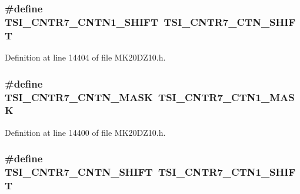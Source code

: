 \subsubsection[{\texorpdfstring{T\+S\+I\+\_\+\+C\+N\+T\+R7\+\_\+\+C\+N\+T\+N1\+\_\+\+S\+H\+I\+FT}{TSI_CNTR7_CNTN1_SHIFT}}]{\setlength{\rightskip}{0pt plus 5cm}\#define T\+S\+I\+\_\+\+C\+N\+T\+R7\+\_\+\+C\+N\+T\+N1\+\_\+\+S\+H\+I\+FT~{\bf T\+S\+I\+\_\+\+C\+N\+T\+R7\+\_\+\+C\+T\+N\+\_\+\+S\+H\+I\+FT}}\hypertarget{group___backward___compatibility___symbols_gaeabebb89e6f4cba3e9cb85dcda2a2d8d}{}\label{group___backward___compatibility___symbols_gaeabebb89e6f4cba3e9cb85dcda2a2d8d}


Definition at line 14404 of file M\+K20\+D\+Z10.\+h.

\subsubsection[{\texorpdfstring{T\+S\+I\+\_\+\+C\+N\+T\+R7\+\_\+\+C\+N\+T\+N\+\_\+\+M\+A\+SK}{TSI_CNTR7_CNTN_MASK}}]{\setlength{\rightskip}{0pt plus 5cm}\#define T\+S\+I\+\_\+\+C\+N\+T\+R7\+\_\+\+C\+N\+T\+N\+\_\+\+M\+A\+SK~{\bf T\+S\+I\+\_\+\+C\+N\+T\+R7\+\_\+\+C\+T\+N1\+\_\+\+M\+A\+SK}}\hypertarget{group___backward___compatibility___symbols_ga9e85300eb5e475c8ebd381c36b5da451}{}\label{group___backward___compatibility___symbols_ga9e85300eb5e475c8ebd381c36b5da451}


Definition at line 14400 of file M\+K20\+D\+Z10.\+h.

\subsubsection[{\texorpdfstring{T\+S\+I\+\_\+\+C\+N\+T\+R7\+\_\+\+C\+N\+T\+N\+\_\+\+S\+H\+I\+FT}{TSI_CNTR7_CNTN_SHIFT}}]{\setlength{\rightskip}{0pt plus 5cm}\#define T\+S\+I\+\_\+\+C\+N\+T\+R7\+\_\+\+C\+N\+T\+N\+\_\+\+S\+H\+I\+FT~{\bf T\+S\+I\+\_\+\+C\+N\+T\+R7\+\_\+\+C\+T\+N1\+\_\+\+S\+H\+I\+FT}}\hypertarget{group___backward___compatibility___symbols_ga3be46fa64186d37f59442a85436ca544}{}\label{group___backward___compatibility___symbols_ga3be46fa64186d37f59442a85436ca544}


